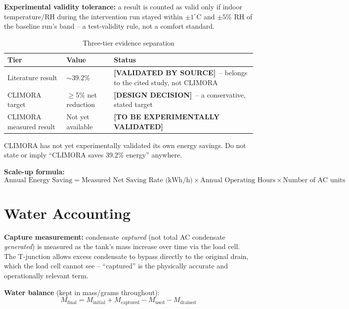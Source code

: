 \documentclass[11pt,a4paper]{article}
\newcommand{\validated}{\textcolor{climoragreen}{\textbf{[VALIDATED BY SOURCE]}}}
\newcommand{\design}{\textcolor{blue!60!black}{\textbf{[DESIGN DECISION]}}}
\newcommand{\tobevalidated}{\textcolor{red!70!black}{\textbf{[TO BE EXPERIMENTALLY VALIDATED]}}}
\begin{document}
\textbf{Experimental validity tolerance:} a result is counted as valid only if indoor temperature/RH during the intervention run stayed within $\pm1^\circ$C and $\pm5\%$ RH of the baseline run's band -- a test-validity rule, not a comfort standard.

\begin{table}[h!]
\centering
\caption{Three-tier evidence separation}
\begin{tabular}{p{3.2cm}p{3.2cm}p{6cm}}
\toprule
\textbf{Tier} & \textbf{Value} & \textbf{Status} \\
\midrule
Literature result & $\sim$39.2\% & \validated\ -- belongs to the cited study, not CLIMORA \\
CLIMORA target & $\geq$5\% net reduction & \design\ -- a conservative, stated target \\
CLIMORA measured result & Not yet available & \tobevalidated \\
\bottomrule
\end{tabular}
\end{table}

\begin{limitation}
CLIMORA has not yet experimentally validated its own energy savings. Do not state or imply ``CLIMORA saves 39.2\% energy'' anywhere.
\end{limitation}

\textbf{Scale-up formula:}
\begin{equation}
\text{Annual Energy Saving} = \text{Measured Net Saving Rate (kWh/h)} \times \text{Annual Operating Hours} \times \text{Number of AC units}
\end{equation}

\section{Water Accounting}

\textbf{Capture measurement:} condensate \emph{captured} (not total AC condensate \emph{generated}) is measured as the tank's mass increase over time via the load cell. The T-junction allows excess condensate to bypass directly to the original drain, which the load cell cannot see -- ``captured'' is the physically accurate and operationally relevant term.

\textbf{Water balance} (kept in mass/grams throughout):
\begin{equation}
M_{\text{final}} = M_{\text{initial}} + M_{\text{captured}} - M_{\text{used}} - M_{\text{drained}}
\end{equation}
\end{document}
